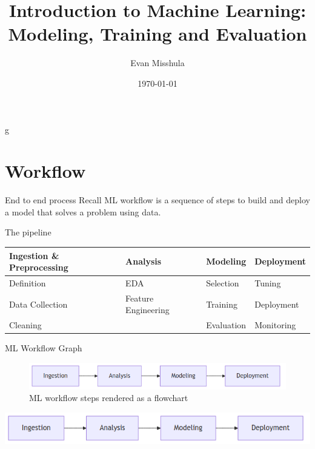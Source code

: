 \documentclass[aspectratio=169]{beamer}
\author{Evan Misshula}
\date{\today}
\title{Introduction to Machine Learning: Modeling, Training and Evaluation}
\begin{document}
\maketitle
g
\section{Workflow}
\label{sec:orgd6313b7}
\begin{frame}[label={sec:org3e22840}]{End to end process}
Recall \alert{ML workflow} is a sequence of steps to build and deploy a model that
solves a problem using data.
\end{frame}

\begin{frame}[label={sec:orgf2b260e}]{The pipeline}
\begin{center}
\begin{tabular}{llll}
Ingestion \& Preprocessing & Analysis & \alert{Modeling} & Deployment\\[0pt]
\hline
Definition & EDA & \alert{Selection} & Tuning\\[0pt]
Data Collection & Feature Engineering & \alert{Training} & Deployment\\[0pt]
Cleaning &  & \alert{Evaluation} & Monitoring\\[0pt]
\end{tabular}
\end{center}
\end{frame}

\begin{frame}[label={sec:org3a3b71d}]{ML Workflow Graph}
\begin{figure}[htbp]
\centering
\includegraphics[width=.9\linewidth]{workflow.png}
\caption{ML workflow steps rendered as a flowchart}
\end{figure}


\begin{center}
\includegraphics[width=.9\linewidth]{workflow.png}
\end{center}
\end{frame}
\end{document}
